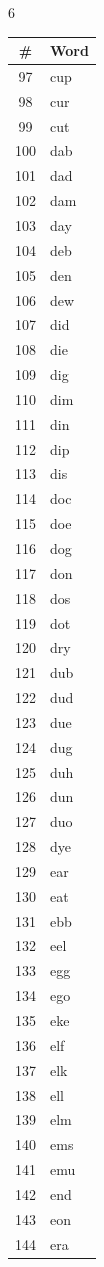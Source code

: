\documentclass[11pt,a4paper]{article}
\begin{document}
\begin{multicols}{6}
\columnbreak

\begin{tabular}{cl}
\toprule
\# & Word \\
\midrule
97 & cup \\
98 & cur \\
99 & cut \\
100 & dab \\
101 & dad \\
102 & dam \\
103 & day \\
104 & deb \\
105 & den \\
106 & dew \\
107 & did \\
108 & die \\
109 & dig \\
110 & dim \\
111 & din \\
112 & dip \\
113 & dis \\
114 & doc \\
115 & doe \\
116 & dog \\
117 & don \\
118 & dos \\
119 & dot \\
120 & dry \\
121 & dub \\
122 & dud \\
123 & due \\
124 & dug \\
125 & duh \\
126 & dun \\
127 & duo \\
128 & dye \\
129 & ear \\
130 & eat \\
131 & ebb \\
132 & eel \\
133 & egg \\
134 & ego \\
135 & eke \\
136 & elf \\
137 & elk \\
138 & ell \\
139 & elm \\
140 & ems \\
141 & emu \\
142 & end \\
143 & eon \\
144 & era \\
\bottomrule
\end{tabular}


\end{multicols}
\end{document}
